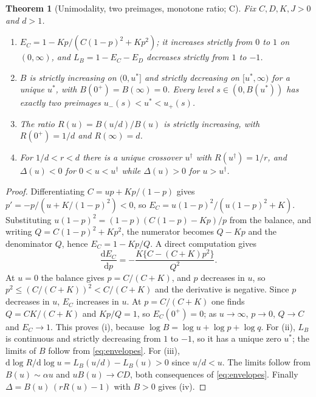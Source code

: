 \documentclass[11pt]{article}
\theoremstyle{plain}
\newtheorem{theorem}{Theorem}[section]
\theoremstyle{definition}
\numberwithin{equation}{section}
\newcommand{\Conv}{\textsf{C}}   %
\begin{document}
\begin{theorem}[Unimodality, two preimages, monotone ratio; \Conv]\label{thm:structure}
Fix $C,D,K,J>0$ and $d>1$.
\begin{enumerate}[label=(\roman*),leftmargin=2.2em,itemsep=1pt]
\item $E_C=1-Kp/(C(1-p)^2+Kp^2)$; it increases strictly from $0$ to $1$ on
$(0,\infty)$, and $L_B=1-E_C-E_D$ decreases strictly from $1$ to $-1$.
\item $B$ is strictly increasing on $(0,u^*]$ and strictly decreasing on
$[u^*,\infty)$ for a unique $u^*$, with $B(0^+)=B(\infty)=0$. Every level
$s\in(0,B(u^*))$ has exactly two preimages $u_-(s)<u^*<u_+(s)$.
\item The ratio $R(u)=B(u/d)/B(u)$ is strictly increasing, with $R(0^+)=1/d$ and
$R(\infty)=d$.
\item For $1/d<r<d$ there is a unique crossover $u^\dagger$ with $R(u^\dagger)=1/r$,
and $\Delta(u)<0$ for $0<u<u^\dagger$ while $\Delta(u)>0$ for $u>u^\dagger$.
\end{enumerate}
\end{theorem}
\begin{proof}
Differentiating $C=up+Kp/(1-p)$ gives $p'=-p/(u+K/(1-p)^2)<0$, so
$E_C=u(1-p)^2/(u(1-p)^2+K)$. Substituting $u(1-p)^2=(1-p)(C(1-p)-Kp)/p$ from the
balance, and writing $Q=C(1-p)^2+Kp^2$, the numerator becomes $Q-Kp$ and the
denominator $Q$, hence $E_C=1-Kp/Q$. A direct computation gives
\[
 \frac{\mathrm dE_C}{\mathrm dp}=-\frac{K\{C-(C+K)p^2\}}{Q^2}.
\]
At $u=0$ the balance gives $p=C/(C+K)$, and $p$ decreases in $u$, so
$p^2\le(C/(C+K))^2<C/(C+K)$ and the derivative is negative. Since $p$ decreases in
$u$, $E_C$ increases in $u$. At $p=C/(C+K)$ one finds $Q=CK/(C+K)$ and $Kp/Q=1$, so
$E_C(0^+)=0$; as $u\to\infty$, $p\to0$, $Q\to C$ and $E_C\to1$. This proves (i),
because $\log B=\log u+\log p+\log q$.
For (ii), $L_B$ is continuous and strictly decreasing from $1$ to $-1$, so it has a
unique zero $u^*$; the limits of $B$ follow from \eqref{eq:envelopes}.
For (iii), $\mathrm d\log R/\mathrm d\log u=L_B(u/d)-L_B(u)>0$ since $u/d<u$. The
limits follow from $B(u)\sim\alpha u$ and $uB(u)\to CD$, both consequences of
\eqref{eq:envelopes}. Finally $\Delta=B(u)\,(rR(u)-1)$ with $B>0$ gives (iv).
\end{proof}
\end{document}
